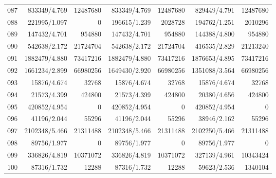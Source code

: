 \begin{longtable}{crrrrrr}
087 & 833349/4.769 & 12487680 & 833349/4.769 & 12487680 & 829449/4.791 & 12487680 \\
088 & 221995/1.097 & 0 & 196615/1.239 & 2028728 & 194762/1.251 & 2010296 \\
089 & 147432/4.701 & 954880 & 147432/4.701 & 954880 & 144388/4.800 & 954880 \\
090 & 542638/2.172 & 21724704 & 542638/2.172 & 21724704 & 416535/2.829 & 21213240 \\
091 & 1882479/4.880 & 73417216 & 1882479/4.880 & 73417216 & 1876653/4.895 & 73417216 \\
092 & 1661234/2.899 & 66980256 & 1649430/2.920 & 66980256 & 1351088/3.564 & 66980256 \\
093 & 15876/4.674 & 32768 & 15876/4.674 & 32768 & 15876/4.674 & 32768 \\
094 & 21573/4.399 & 424800 & 21573/4.399 & 424800 & 20380/4.656 & 424800 \\
095 & 420852/4.954 & 0 & 420852/4.954 & 0 & 420852/4.954 & 0 \\
096 & 41196/2.044 & 55296 & 41196/2.044 & 55296 & 38946/2.162 & 55296 \\
097 & 2102348/5.466 & 21311488 & 2102348/5.466 & 21311488 & 2102250/5.466 & 21311488 \\
098 & 89756/1.977 & 0 & 89756/1.977 & 0 & 89756/1.977 & 0 \\
099 & 336826/4.819 & 10371072 & 336826/4.819 & 10371072 & 327139/4.961 & 10343424 \\
100 & 87316/1.732 & 12288 & 87316/1.732 & 12288 & 59623/2.536 & 1340104 \\
\end{longtable}
